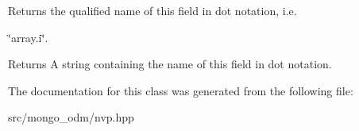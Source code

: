 Returns the qualified name of this field in dot notation, i.\+e. 

\char`\"{}array.\+i\char`\"{}. \begin{DoxyReturn}{Returns}
A string containing the name of this field in dot notation. 
\end{DoxyReturn}


The documentation for this class was generated from the following file\+:\begin{DoxyCompactItemize}
\item 
src/mongo\+\_\+odm/nvp.\+hpp\end{DoxyCompactItemize}
